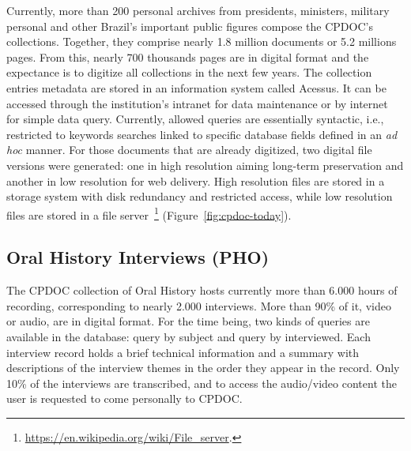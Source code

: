 Currently, more than 200 personal archives from
presidents, ministers, military personal and other Brazil's important
public figures compose the CPDOC's collections. Together, they
comprise nearly 1.8 million documents or 5.2 millions pages. From
this, nearly 700 thousands pages are in digital format and the
expectance is to digitize all collections in the next few years. The
collection entries metadata are stored in an information system called
Acessus. It can be accessed through the institution's intranet for
data maintenance or by internet for simple data query.
Currently, allowed queries are essentially syntactic, i.e.,
restricted to keywords searches linked to specific database fields
defined in an \emph{ad hoc} manner. For those documents that are
already digitized, two digital file versions were generated: one in
high resolution aiming long-term preservation and another in low
resolution for web delivery. High resolution files are stored in a storage system
with disk redundancy and restricted access, while low resolution files
are stored in a file
server~\footnote{\url{https://en.wikipedia.org/wiki/File_server}.}
(Figure~\ref{fig:cpdoc-today}).

\subsection{Oral History Interviews (PHO)}

The CPDOC collection of Oral History hosts currently more than 6.000
hours of recording, corresponding to nearly 2.000 interviews.  More
than 90\% of it, video or audio, are in digital format. For the time being,
two kinds of queries are available in the database: query by subject and
query by interviewed. Each interview record holds a brief technical
information and a summary with descriptions of the interview
themes in the order they appear in the record. Only 10\% of the
interviews are transcribed, and to access the audio/video content the
user is requested to come personally to CPDOC. 

